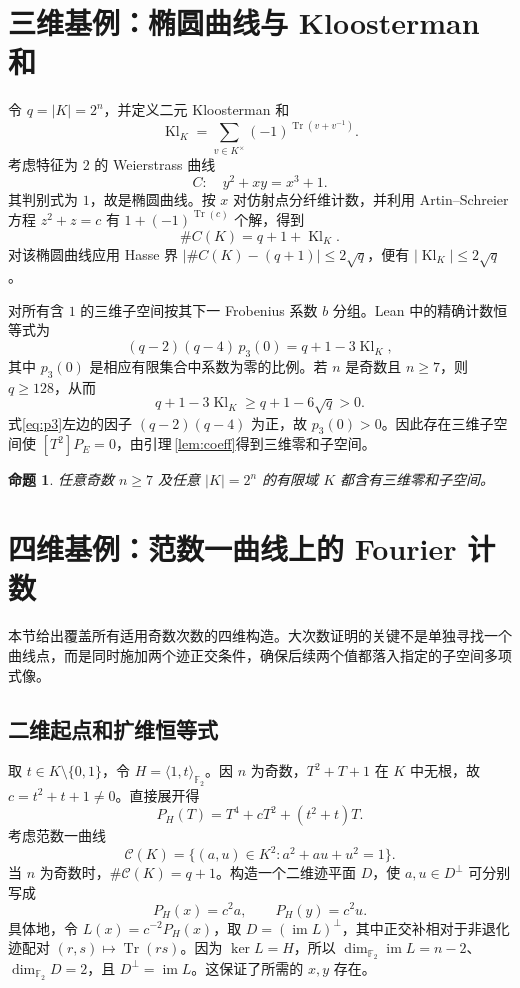 \documentclass[UTF8,a4paper,11pt]{ctexart}
\numberwithin{equation}{section}
\newtheorem{proposition}[theorem]{命题}
\theoremstyle{definition}
\theoremstyle{remark}
\newcommand{\Ftwo}{\mathbb F_2}
\newcommand{\tr}{\operatorname{Tr}}
\newcommand{\dimf}{\dim_{\Ftwo}}
\begin{document}
\section{三维基例：椭圆曲线与 Kloosterman 和}

令 $q=|K|=2^n$，并定义二元 Kloosterman 和
\[
 \operatorname{Kl}_K=\sum_{v\in K^\times}(-1)^{\tr(v+v^{-1})}.
\]
考虑特征为 $2$ 的 Weierstrass 曲线
\[
 C:\quad y^2+xy=x^3+1.
\]
其判别式为 $1$，故是椭圆曲线。按 $x$ 对仿射点分纤维计数，并利用 Artin--Schreier 方程 $z^2+z=c$ 有 $1+(-1)^{\tr(c)}$ 个解，得到
\[
 \#C(K)=q+1+\operatorname{Kl}_K.
\]
对该椭圆曲线应用 Hasse 界\cite{Silverman} $|\#C(K)-(q+1)|\le2\sqrt q$，便有 $|\operatorname{Kl}_K|\le2\sqrt q$。

对所有含 $1$ 的三维子空间按其下一 Frobenius 系数 $b$ 分组。Lean 中的精确计数恒等式为
\begin{equation}\label{eq:p3}
 (q-2)(q-4)\,p_3(0)=q+1-3\operatorname{Kl}_K,
\end{equation}
其中 $p_3(0)$ 是相应有限集合中系数为零的比例。若 $n$ 是奇数且 $n\ge7$，则 $q\ge128$，从而
\[
 q+1-3\operatorname{Kl}_K\ge q+1-6\sqrt q>0.
\]
式\eqref{eq:p3}左边的因子 $(q-2)(q-4)$ 为正，故 $p_3(0)>0$。因此存在三维子空间使 $[T^2]P_E=0$，由引理\,\ref{lem:coeff}得到三维零和子空间。

\begin{proposition}\label{prop:k3}
任意奇数 $n\ge7$ 及任意 $|K|=2^n$ 的有限域 $K$ 都含有三维零和子空间。
\end{proposition}

\section{四维基例：范数一曲线上的 Fourier 计数}

本节给出覆盖所有适用奇数次数的四维构造。大次数证明的关键不是单独寻找一个曲线点，而是同时施加两个迹正交条件，确保后续两个值都落入指定的子空间多项式像。

\subsection{二维起点和扩维恒等式}

取 $t\in K\setminus\{0,1\}$，令 $H=\langle1,t\rangle_{\Ftwo}$。因 $n$ 为奇数，$T^2+T+1$ 在 $K$ 中无根，故 $c=t^2+t+1\ne0$。直接展开得
\[
 P_H(T)=T^4+cT^2+(t^2+t)T.
\]
考虑范数一曲线
\begin{equation}\label{eq:normcurve}
 \mathcal C(K)=\{(a,u)\in K^2:a^2+au+u^2=1\}.
\end{equation}
当 $n$ 为奇数时，$\#\mathcal C(K)=q+1$。构造一个二维迹平面 $D$，使 $a,u\in D^\perp$ 可分别写成
\[
 P_H(x)=c^2a,\qquad P_H(y)=c^2u.
\]
具体地，令 $L(x)=c^{-2}P_H(x)$，取 $D=(\operatorname{im}L)^\perp$，其中正交补相对于非退化迹配对 $(r,s)\mapsto\tr(rs)$。因为 $\ker L=H$，所以 $\dimf\operatorname{im}L=n-2$、$\dimf D=2$，且 $D^\perp=\operatorname{im}L$。这保证了所需的 $x,y$ 存在。
\end{document}
